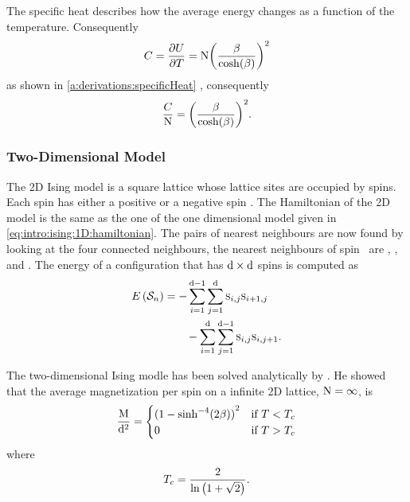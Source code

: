 	The specific heat describes how the average energy changes as a function of the temperature. Consequently
	\begin{equation*}
		C = \frac{\partial U}{\partial T} = \mathrm{N} {\left(\frac{\beta}{\cosh(\beta)}\right)}^{2}
	\end{equation*}
	as shown in \cref{a:derivations:specificHeat} \cite{warkHandout}, consequently
	\begin{equation*}
	 	\frac{C}{\mathrm{N}} = {\left(\frac{\beta}{\cosh(\beta)}\right)}^2.
	 \end{equation*}
 
\subsubsection{Two-Dimensional Model}
	\label{sss:intro:ising:2D}
	The 2D Ising model is a square lattice whose lattice sites are occupied by spins. Each spin has either a positive or a negative spin \cite{kenzel1997physics}. The Hamiltonian of the 2D model is the same as the one of the one dimensional model given in \cref{eq:intro:ising:1D:hamiltonian}. The pairs of nearest neighbours are now found by looking at the four connected neighbours, \ie the nearest neighbours of \mbox{spin } are , ,  and . The energy of a configuration  that has $\mathrm{d} \times \mathrm{d}$ spins is computed as
	\begin{equation}
		\label{eq:intro:ising:2d:energy}
		\begin{split}
		E\left(\mathcal{S}_{n} \right) 
			& = - \sum_{i = 1}^{\mathrm{d} - 1}\sum_{j = 1}^{\mathrm{d}} \textsc{s}_{i,j}\textsc{s}_{i+1,j}\\
			&\quad\quad - \sum_{i = 1}^{\mathrm{d}}\sum_{j = 1}^{\mathrm{d} - 1} \textsc{s}_{i,j} \textsc{s}_{i, j+1}.
		\end{split}
	\end{equation}

	The two-dimensional Ising modle has been solved analytically by \textcite{onsager1944crystal}. He showed that the average magnetization per spin on a infinite 2D lattice, \ie $\mathrm{N} = \infty$, is
	\begin{equation}
		\label{eq:intro:ising:2D:magnetizationAnalytical}
		\frac{\mathrm{M}}{\mathrm{d}^2} = \begin{cases}
			{(1 - {\sinh}^{-4}(2\beta))}^2 & \text{if } T < T_{c}\\
			0 								& \text{if } T > T_{c}
		\end{cases}
	\end{equation}
	where
	\begin{equation*}
		T_{c} = \frac{2}{\ln \left(1 + \sqrt{2}\right)}.
	\end{equation*}

